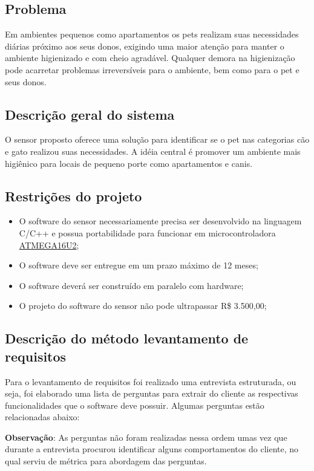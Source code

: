 \documentclass[12pt,a4paper]{article}
\begin{document}
\subsection{Problema}
Em ambientes pequenos como apartamentos os pets realizam suas necessidades
diárias próximo aos seus donos, exigindo uma maior atenção para manter o
ambiente higienizado e com cheio agradável. Qualquer demora na higienização
pode acarretar problemas irreversíveis para o ambiente, bem como para o pet
e seus donos.

\subsection{Descrição geral do sistema}
O sensor proposto oferece uma solução para identificar se o pet nas categorias
cão e gato realizou suas necessidades. A idéia central é promover um ambiente
mais higiênico para locais de pequeno porte como apartamentos e canis.

\subsection{Restrições do projeto}
\begin{itemize}
	\item O software do sensor necessariamente precisa ser desenvolvido na
		linguagem C/C++ e possua portabilidade para funcionar em
		\gls{microcontroladora}
	\href{http://ww1.microchip.com/downloads/en/DeviceDoc/doc7799.pdf}{ATMEGA16U2};
	\item O software deve ser entregue em um prazo máximo de 12 meses;
	\item O software deverá ser construído em paralelo com hardware;
	\item O projeto do software do sensor não pode ultrapassar R\$ 3.500,00;
\end{itemize}

\subsection{Descrição do método levantamento de requisitos}
Para o levantamento de requisitos foi realizado uma entrevista estruturada, ou
seja, foi elaborado uma lista de perguntas para extrair do cliente as
respectivas funcionalidades que o software deve possuir. Algumas perguntas
estão relacionadas abaixo:

\textbf{Observação}: As perguntas não foram realizadas nessa ordem umas vez que
durante a entrevista procurou identificar alguns comportamentos do cliente, no
qual serviu de métrica para abordagem das perguntas.
\end{document}
